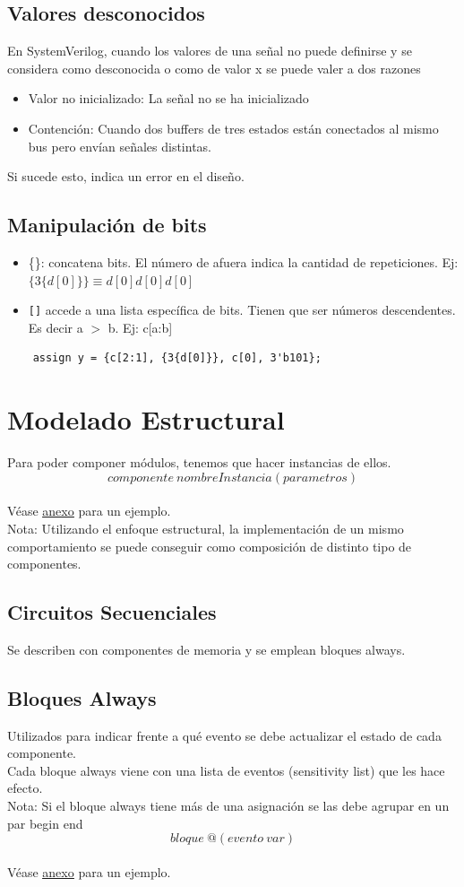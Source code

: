 \documentclass[10pt,a4paper]{article}
\begin{document}
\subsection*{Valores desconocidos}
En SystemVerilog, cuando los valores de una señal no puede definirse y se considera como desconocida o como de valor x se puede valer a dos razones 
\begin{itemize}
    \item Valor no inicializado: La señal no se ha inicializado
    \item Contención: Cuando dos buffers de tres estados están conectados al mismo bus pero envían señales distintas.
\end{itemize}
Si sucede esto, indica un error en el diseño. 
\subsection*{Manipulación de bits}
\begin{itemize}
    \item \{\}: concatena bits. El número de afuera indica la cantidad de repeticiones. Ej: $ \{3\{d[0]\}\} \equiv d[0]d[0]d[0] $  
    \item \texttt{[]} accede a una lista específica de bits. Tienen que ser números descendentes. Es decir a $>$ b. Ej: c[a:b]
\end{itemize}
\begin{lstlisting}
    assign y = {c[2:1], {3{d[0]}}, c[0], 3'b101};
\end{lstlisting}
\section*{Modelado Estructural}
Para poder componer módulos, tenemos que hacer instancias de ellos. 
\[componente \ nombreInstancia(parametros)\] \\ 
Véase \hyperref[subsec:SVL_comp]{\underline{anexo}} para un ejemplo. \\
Nota: Utilizando el enfoque estructural, la implementación de un mismo comportamiento se puede conseguir como composición de distinto tipo de componentes. 
\subsection*{Circuitos Secuenciales}
Se describen con componentes de memoria y se emplean bloques always.
\subsection*{Bloques Always}
\label{subsec:bloques_always}
Utilizados para indicar frente a qué evento se debe actualizar el estado de cada componente. \\ 
Cada bloque always viene con una lista de eventos (sensitivity list) que les hace efecto.  \\
Nota: Si el bloque always tiene más de una asignación se las debe agrupar en un par begin end \\
\[bloque \ @(evento \ var)\] \\ 
Véase \hyperref[subsec:SVL_bloques_clk]{\underline{anexo}} para un ejemplo. 
\end{document}
